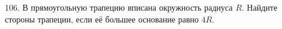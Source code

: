 106. В прямоугольную трапецию вписана окружность радиуса $R.$ Найдите стороны трапеции, если её большее основание равно $4R.$\\
